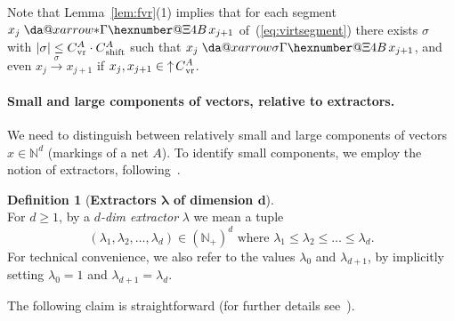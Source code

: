 \documentclass[11pt,a4paper]{amsart}
\makeatletter
\newcommand{\step}[1]{\mathrel{\xrightarrow{#1}}}
\newcommand{\virtual}[1]{\mathrel{\xdashrightarrow{#1}}\hspace{-0.3em}}
\newcommand{\vreach}{\virtual{*}}
\newcommand{\vr}{{}_\textnormal{vr}}
\newcommand{\upC}[1]{\mathop{\uparrow}#1}
\newcommand{\shift}{{}_\textnormal{shift}}
\newcommand{\Nat}{\mathbb{N}}
\newcommand{\setN}{\Nat}
\newcommand*{\da@rightarrow}{\mathchar"0\hexnumber@\symAMSa 4B }
\newcommand*{\xdashrightarrow}[2][]{%
  \mathrel{%
    \mathpalette{\da@xarrow{#1}{#2}{}\da@rightarrow{\,}{}}{}%
  }%
}
\newcommand*{\da@xarrow}[7]{%
  \sbox0{$\ifx#7\scriptstyle\scriptscriptstyle\else\scriptstyle\fi#5#1#6\m@th$}%
  \sbox2{$\ifx#7\scriptstyle\scriptscriptstyle\else\scriptstyle\fi#5#2#6\m@th$}%
  \sbox4{$#7\dabar@\m@th$}%
  \dimen@=\wd0 %
  \ifdim\wd2 >\dimen@
    \dimen@=\wd2 %
  \fi
  \count@=2 %
  \def\da@bars{\dabar@\dabar@}%
  \@whiledim\count@\wd4<\dimen@\do{%
    \advance\count@\@ne
    \expandafter\def\expandafter\da@bars\expandafter{%
      \da@bars
      \dabar@ 
    }%
  }%
  \mathrel{#3}%
  \mathrel{%
    \mathop{\da@bars}\limits
    \ifx\\#1\\%
    \else
      _{\copy0}%
    \fi
    \ifx\\#2\\%
    \else
      ^{\copy2}%
    \fi
  }%
  \mathrel{#4}%
}
\theoremstyle{plain}
\theoremstyle{definition}
\newtheorem{defi}[thm]{Definition}
\theoremstyle{defC}
\theoremstyle{thmC}
\makeatother
\begin{document}
\noindent
Note that Lemma~\ref{lem:fvr}(1) implies that for each segment $x_j\vreach x_{j+1}$
of~(\ref{eq:virtsegment}) there exists  $\sigma$ with
$|\sigma|\leq C\vr^A\cdot C\shift^A$ such that
$x_j\virtual{\sigma}x_{j+1}$,
and even $x_j\step{\sigma}x_{j+1}$ if $x_j,x_{j+1}\in\upC{C\vr^A}$.


\paragraph{Small and large components of vectors, relative to
extractors.}
We need to distinguish between relatively small and large components 
of vectors $x \in \setN^d$ (markings of a net $A$). 
To identify small components, we employ the notion of 
extractors, following~\cite{DBLP:conf/fsttcs/Leroux19}.


\begin{defi}[\textbf{Extractors $\bm{\lambda}$	of dimension $\bm{d}$}]\label{def:extract}
\hfill\\	
For $d\geq 1$, by a \emph{$d$-dim extractor} $\lambda$
we mean a tuple 
	\[(\lambda_1,\lambda_2,\dots,\lambda_d)\in(\setN_+)^d
	\text{ where }\lambda_1\leq\lambda_2 \leq \dots \leq
	\lambda_{d}.\]
For technical convenience, we also refer to the values $\lambda_0$
	and $\lambda_{d+1}$, by
implicitly setting $\lambda_0=1$ and $\lambda_{d+1}=\lambda_d$.
\end{defi}

\noindent
The following claim is straightforward (for further details
see~\cite{DBLP:conf/fsttcs/Leroux19}).
\end{document}
